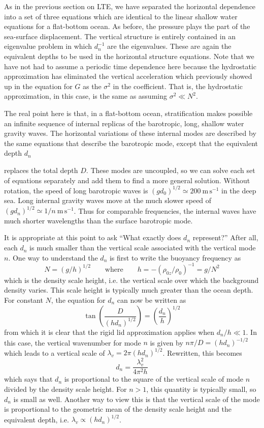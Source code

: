 As in the previous section on LTE, we have separated the horizontal dependence
into a set of three equations which are identical to the linear shallow water equations
for a flat-bottom ocean. As before, the pressure plays the part of the sea-surface
displacement. The vertical structure is entirely contained in an eigenvalue problem in
which $d_n^{-1}$ are the eigenvalues. These are again the equivalent depths to be used in the
horizontal structure equations. Note that we have not had to assume a periodic time
dependence here because the hydrostatic approximation has eliminated the vertical
acceleration which previously showed up in the equation for $G$ as the $\sigma^2$ in the
coefficient. That is, the hydrostatic approximation, in this case, is the same as
assuming $\sigma^2\ll N^2$.

The real point here is that, in a flat-bottom ocean, stratification makes possible
an infinite sequence of internal replicas of the barotropic, long, shallow water gravity
waves. The horizontal variations of these internal modes are described by the same
equations that describe the barotropic mode, except that the equivalent depth $d_n$


replaces the total depth $D$. These modes are uncoupled, so we can solve each set of
equations separately and add them to find a more general solution. Without rotation,
the speed of long barotropic waves is $(gd_0)^{1/2}\simeq200\ \mathrm{m\,s^{-1}}$ in the deep sea. Long
internal gravity waves move at the much slower speed of $(gd_n)^{1/2}\simeq1/n\ \mathrm{m\,s^{-1}}$. Thus
for comparable frequencies, the internal waves have much shorter wavelengths than the
surface barotropic mode.

It is appropriate at this point to ask ``What exactly does $d_n$ represent?'' After
all, each $d_n$ is much smaller than the vertical scale associated with the vertical mode $n$.
One way to understand the $d_n$ is first to write the buoyancy frequency as
\[
	N=(g/h)^{1/2}
	\qquad\text{where}\qquad
	h=-(\rho_{0z}/\rho_0)^{-1}=g/N^2
\]
which is the density scale height, i.e. the vertical scale over which the background
density varies. This scale height is typically much greater than the ocean depth. For
constant $N$, the equation for $d_n$ can now be written as
\[
	\tan\left(\frac{D}{(hd_n)^{1/2}}\right)
	=\left(\frac{d_n}{h}\right)^{1/2}
\]
from which it is clear that the rigid lid approximation applies when $d_n/h\ll1$. In this
case, the vertical wavenumber for mode $n$ is given by
$n\pi/D=(hd_n)^{-1/2}$ which leads to
a vertical scale of $\lambda_v=2\pi(hd_n)^{1/2}$. Rewritten, this becomes
\[
	d_n=\frac{\lambda_v^2}{4\pi^2h}
\]
which says that $d_n$ is proportional to the square of the vertical scale of mode $n$ divided
by the density scale height. For $n>1$, this quantity is typically small, so $d_n$ is small as
well. Another way to view this is that the vertical scale of the mode is proportional to
the geometric mean of the density scale height and the equivalent depth, i.e.
$\lambda_v\propto(hd_n)^{1/2}$.

